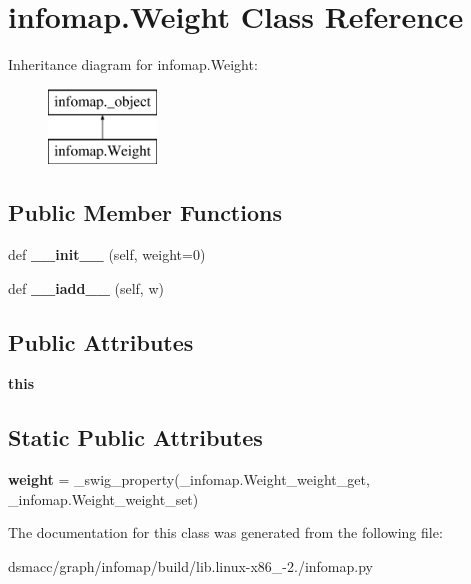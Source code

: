\hypertarget{classinfomap_1_1Weight}{}\section{infomap.\+Weight Class Reference}
\label{classinfomap_1_1Weight}
Inheritance diagram for infomap.\+Weight\+:\begin{figure}[H]
\begin{center}
\leavevmode
\includegraphics[height=2.000000cm]{classinfomap_1_1Weight}
\end{center}
\end{figure}
\subsection*{Public Member Functions}
\begin{DoxyCompactItemize}
\item 
\mbox{\label{classinfomap_1_1Weight_a6506d181efbe8b19d1446ce1a469d039}} 
def {\bfseries \+\_\+\+\_\+init\+\_\+\+\_\+} (self, weight=0)
\item 
\mbox{\label{classinfomap_1_1Weight_ac5042d7bb860e92c3373aa911a0cbd57}} 
def {\bfseries \+\_\+\+\_\+iadd\+\_\+\+\_\+} (self, w)
\end{DoxyCompactItemize}
\subsection*{Public Attributes}
\begin{DoxyCompactItemize}
\item 
\mbox{\label{classinfomap_1_1Weight_ac84698587032054b1f3b32879cdbfb02}} 
{\bfseries this}
\end{DoxyCompactItemize}
\subsection*{Static Public Attributes}
\begin{DoxyCompactItemize}
\item 
\mbox{\label{classinfomap_1_1Weight_a7300eda829563f364184fb4981be0a78}} 
{\bfseries weight} = \+\_\+swig\+\_\+property(\+\_\+infomap.\+Weight\+\_\+weight\+\_\+get, \+\_\+infomap.\+Weight\+\_\+weight\+\_\+set)
\end{DoxyCompactItemize}


The documentation for this class was generated from the following file\+:\begin{DoxyCompactItemize}
\item 
dsmacc/graph/infomap/build/lib.\+linux-\/x86\+\_-\/2./infomap.\+py\end{DoxyCompactItemize}
